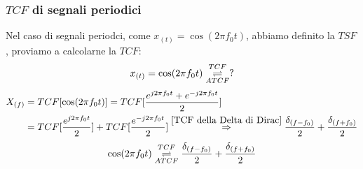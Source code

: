         \subsubsection{$TCF$ di segnali periodici}\label{TCF di segnali periodici}
                Nel caso di segnali periodci, come $x_{(t)} = \cos(2\pi f_0t)$, abbiamo definito la $TSF$, proviamo a calcolarne la $TCF$:
                \[
                    x_{(t)} = \cos(2\pi f_0t) \overunderset{TCF}{ATCF}{\rightleftharpoons} ?
                \] 
                \begin{align}
                    X_{(f)} &= TCF[\cos(2\pi f_0t)] = TCF[\frac{e^{j2\pi f_0t}+ e^{-j2\pi f_0t}}{2}] \nonumber \\
                            &= TCF[\frac{e^{j2\pi f_0t}}{2}] + TCF[\frac{e^{-j2\pi f_0t}}{2}] \overset{\ref{TCF della Delta di Dirac}}{\Rightarrow}  \frac{\delta_{(f-f_0)}}{2} +\frac{\delta_{(f+f_0)}}{2} \nonumber
                \end{align}
                \[
                    \cos(2\pi f_0t) \overunderset{TCF}{ATCF}{\rightleftharpoons} \frac{\delta_{(f-f_0)}}{2} +\frac{\delta_{(f+f_0)}}{2}
                \]\label{TCF di un coseno}

